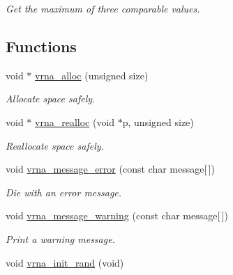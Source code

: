 \begin{DoxyCompactItemize}
\begin{DoxyCompactList}\small\item\em Get the maximum of three comparable values. \end{DoxyCompactList}\end{DoxyCompactItemize}
\subsection*{Functions}
\begin{DoxyCompactItemize}
\item 
void $\ast$ \hyperlink{group__utils_gaf37a0979367c977edfb9da6614eebe99}{vrna\+\_\+alloc} (unsigned size)
\begin{DoxyCompactList}\small\item\em Allocate space safely. \end{DoxyCompactList}\item 
void $\ast$ \hyperlink{group__utils_ga27f4719a66c6f90d1cca3d1e6e696c6a}{vrna\+\_\+realloc} (void $\ast$p, unsigned size)
\begin{DoxyCompactList}\small\item\em Reallocate space safely. \end{DoxyCompactList}\item 
void \hyperlink{group__utils_gabb76f8f8dbd652fa4a24037cf4524373}{vrna\+\_\+message\+\_\+error} (const char message\mbox{[}$\,$\mbox{]})
\begin{DoxyCompactList}\small\item\em Die with an error message. \end{DoxyCompactList}\item 
void \hyperlink{group__utils_gafe4072406bd287c6857763dd7d2fe1f1}{vrna\+\_\+message\+\_\+warning} (const char message\mbox{[}$\,$\mbox{]})
\begin{DoxyCompactList}\small\item\em Print a warning message. \end{DoxyCompactList}\item 
\hypertarget{group__utils_ga0ad1f40ea316e5c5918695c35613027a}{}void \hyperlink{group__utils_ga0ad1f40ea316e5c5918695c35613027a}{vrna\+\_\+init\+\_\+rand} (void)\label{group__utils_ga0ad1f40ea316e5c5918695c35613027a}


\end{DoxyCompactItemize}

